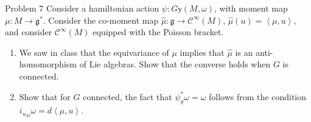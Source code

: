 \iffalse\begin{proof}[Solution]\leavevmode
\begin{enumerate}[label=(\alph*)]
\item Na Lista 1 já vimos que $\mathsf{U}(n)$ é a interseção $\mathsf{GL}(n,\mathbb{C})\cap \mathsf{Sp}(2n)$. (Isso foi feito por meio das expressões
\begin{align*}\mathsf{Sp}(2n)&=\{A\in\mathsf{GL}(2n,\mathbb{R}):A^{\mathbf{T}}J_0A=J_0\},\\ \mathsf{GL}(n,\mathbb{C})&=\{A\in\mathsf{GL}(2n,\mathbb{R}):A J_0=J_0 A\}\end{align*}
\end{enumerate}
aqui $\mathsf{GL}(n,\mathbb{C})$ é visto como o subgrupo de $\mathsf{GL}(2n,\mathbb{R})$ dado pelas matrizes
\[\begin{pmatrix}A&-B\\ B&A\end{pmatrix}\]
\end{proof}\fi

\begin{thing3}{Problem 7}\leavevmode
Consider a hamiltonian action $\psi:G \mathbb{y}(M,\omega)$, with moment map $\mu:M\to\mathfrak{g}^*$. Consider the co-moment map $\hat{\mu}:\mathfrak{g}\to\mathcal{C}^\infty(M)$, $\hat{\mu}(u)=\left<\mu,u\right>$, and consider $\mathcal{C}^\infty(M)$ equipped with the Poisson bracket.
\begin{enumerate}[label=(\alph*)]
\item We saw in class that the equivariance of $\mu$ implies that $\hat{\mu}$ is an anti-homomorphism of Lie algebras. Show that the converse holds when $G$ is connected.
\item Show that for $G$ connected, the fact that $\psi^*_g\omega=\omega$ follows from the condition $i_{u_M}\omega=d \left<\mu,u\right>$.
\end{enumerate}
\end{thing3}

